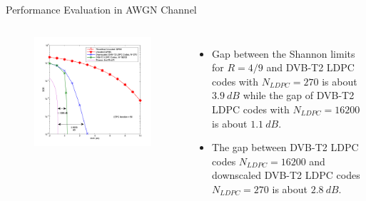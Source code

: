 \documentclass[11pt, aspectratio=169]{beamer}
\begin{document}
\begin{frame}{Performance Evaluation in AWGN Channel}
\vspace{-25pt}
\begin{columns}
\begin{figure}
\centering 
\includegraphics[scale=0.5]{gambarafa/AWGN-2}

\label{awgn} %
\end{figure}
\begin{itemize}
\item Gap between the Shannon limits for $R=4/9$ and  DVB-T2 LDPC codes with $N_{LDPC}=270$ is about $3.9~dB$ while the gap of DVB-T2 LDPC codes with $N_{LDPC}=16200$ is about $1.1~dB$.
\item The gap between DVB-T2 LDPC codes  $N_{LDPC}=16200$ and downscaled DVB-T2 LDPC codes $N_{LDPC}=270$ is about $2.8~dB$.
\end{itemize}
\end{columns}
\end{frame}
\end{document}
